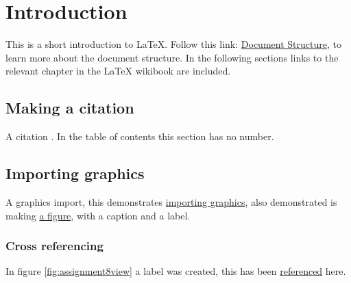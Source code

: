 \chapter{Introduction}
\label{sec:introduction}
This is a short introduction to LaTeX.
Follow this link: \href{http://en.wikibooks.org/wiki/LaTeX/Document_Structure}{Document Structure}, to learn more about the document structure. In the following sections links to the relevant chapter in the LaTeX wikibook are included.

\section*{Making a citation}
\label{sec:citation}
A citation \cite{OOAD}. In the table of contents this section has no number.

\section{Importing graphics}
A graphics import, this demonstrates \href{http://en.wikibooks.org/wiki/LaTeX/Importing_Graphics}{importing graphics}, also demonstrated is making \href{http://en.wikibooks.org/wiki/LaTeX/Floats,_Figures_and_Captions}{a figure}, with a caption and a label.

\subsection{Cross referencing}
In figure \ref{fig:assignment8view} a label was created, this has been \href{http://en.wikibooks.org/wiki/LaTeX/Labels_and_Cross-referencing}{referenced} here.

